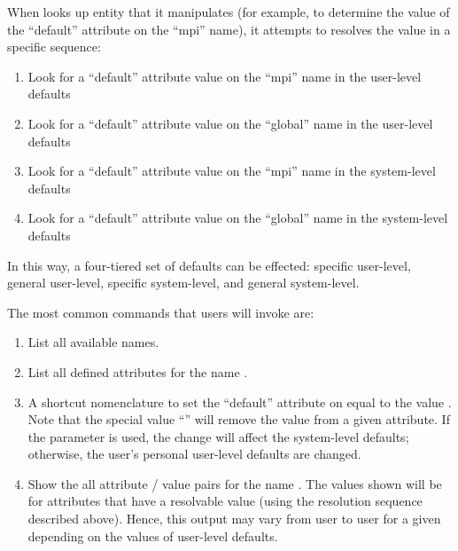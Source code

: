 When  looks up entity that it manipulates (for
example, to determine the value of the ``default'' attribute on the
``mpi'' name), it attempts to resolves the value in a specific
sequence:

\begin{enumerate}
\item Look for a ``default'' attribute value on the ``mpi'' name in
  the user-level defaults
  
\item Look for a ``default'' attribute value on the ``global'' name in
  the user-level defaults
  
\item Look for a ``default'' attribute value on the ``mpi'' name in
  the system-level defaults
  
\item Look for a ``default'' attribute value on the ``global'' name in
  the system-level defaults
\end{enumerate}

In this way, a four-tiered set of defaults can be effected: specific
user-level, general user-level, specific system-level, and general
system-level.  

The most common  commands that users will invoke
are:

\begin{enumerate}
\item {}
  
  List all available names.

\item {}
  
  List all defined attributes for the name .

\item {} 
  
  A shortcut nomenclature to set the ``default'' attribute on
   equal to the value .  Note that the
  special value ``'' will remove the value from a given
  attribute.  If the  parameter is used, the change will
  affect the system-level defaults; otherwise, the user's personal
  user-level defaults are changed.

\item {}

  Show the all attribute / value pairs for the name .  The
  values shown will be for attributes that have a resolvable value
  (using the resolution sequence described above).  Hence, this output
  may vary from user to user for a given  depending on the
  values of user-level defaults.

\end{enumerate}

